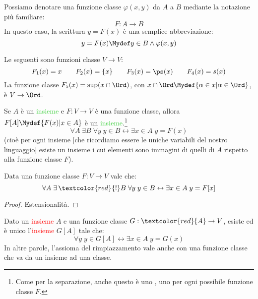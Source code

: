 \documentclass[11pt]{scrartcl}
\begin{document}
\begin{notation}
	Possiamo denotare una funzione classe $\varphi(x,y)$ da $A$ a $B$ mediante la notazione più familiare:
	\[ F : A \rightarrow B
		\]
	In questo caso, la scrittura $y = F(x)$ è una semplice abbreviazione:
	\[ y = F(x) \Mydef y \in B \land \varphi(x,y)
		\]
\end{notation}

\begin{example}
	Le seguenti sono funzioni classe $V \rightarrow V$:
	\[ F_1(x) = x \qquad F_2(x) = \{x\} \qquad F_3(x) = \ps(x) \qquad F_4(x) = s(x)
		\]
	La funzione classe $F_5(x) = \sup(x \cap \Ord)$, con $x \cap \Ord \Mydef \{\alpha \in x | \alpha \in \Ord\}$, è $V \rightarrow \Ord$.
\end{example}

\begin{axiom}
	\label{ax8}
	Se $A$ è un \textcolor{LimeGreen}{insieme} e $F : V \rightarrow V$ è una funzione classe, allora $F[A] \Mydef \{F(x) | x \in A\}$ è un \textcolor{LimeGreen}{insieme}.\footnote{Come per la separazione, anche questo è uno , uno per ogni possibile funzione classe $F$.}
	\[ \forall A \; \exists B \; \forall y \; y \in B \leftrightarrow \exists x \in A \; y = F(x)
		\]
	(cioè per ogni insieme [che ricordiamo essere le uniche variabili del nostro linguaggio] esiste un insieme i cui elementi sono immagini di quelli di $A$ rispetto alla funzione classe $F$).
\end{axiom}

\begin{proposition}
	Data una funzione classe $F : V \rightarrow V$ vale che:
	\[ \forall A \; \exists\,\textcolor{red}{!} B \; \forall y \; y \in B \leftrightarrow \exists x \in A \; y = F[x]
		\]
\end{proposition}

\begin{proof}
	Estensionalità.
\end{proof}

\begin{remark}
	Dato un \textcolor{red}{insieme} $A$ e una funzione classe $G : \textcolor{red}{A} \rightarrow V$, esiste ed è unico l'\textcolor{red}{insieme} $G[A]$ tale che:
	\[ \forall y \; y \in G[A] \leftrightarrow \exists x \in A \; y = G(x)
		\]
	In altre parole, l'assioma del rimpiazzamento vale anche con una funzione classe che va da un insieme ad una classe.
\end{remark}
\end{document}
